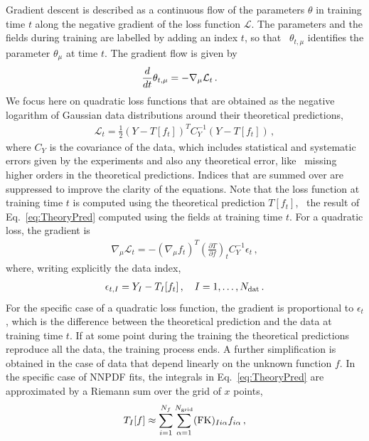 Gradient descent is described as a continuous flow of the parameters $\theta$ in training time $t$
along the negative gradient of the loss function $\mathcal{L}$. The parameters and the fields during
training are labelled by adding an index $t$, so that \eg\ $\theta_{t,\mu}$ identifies the parameter
$\theta_\mu$ at time $t$.
The gradient flow is given by
\begin{align}
    \label{eq:GradientFlowDef}
    \frac{d}{dt} &\theta_{t,\mu} = -\nabla_\mu \mathcal{L}_t\, .
\end{align}
We focus here on quadratic loss functions that are obtained as the negative logarithm of Gaussian
data distributions around their theoretical predictions,
\begin{align}
    \label{eq:QuadLoss}
    \mathcal{L}_t = \frac12 \left(Y - T[f_t]\right)^T C_Y^{-1} \left(Y - T[f_t]\right)\, ,
\end{align}
where $C_Y$ is the covariance of the data, which includes statistical and systematic errors given by
the experiments and also any theoretical error, like \eg\ missing higher orders in the theoretical
predictions. Indices that are summed over are suppressed to improve the clarity of the equations.
Note that the loss function at training time $t$ is computed using the theoretical prediction $T[f_t]$,
\ie\ the result of Eq.~\eqref{eq:TheoryPred} computed using the fields at training time $t$. For a quadratic
loss, the gradient is
\begin{align}
    \nabla_\mu \mathcal{L}_t = - \left(\nabla_\mu f_t\right)^T \left(\frac{\partial T}{\partial f}\right)_t
      C_Y^{-1} \epsilon_t\, ,
\end{align}
where, writing explicitly the data index,
\begin{align}
    \label{eq:EpsDef}
    \epsilon_{t,I} = Y_I - T_I[f_t]\, , \quad I=1, \ldots, N_{\mathrm{dat}}\, .
\end{align}
For the specific case of a quadratic loss function, the gradient is proportional to $\epsilon_t$, which
is the difference between the theoretical prediction and the data at training time $t$. If at some point
during the training the theoretical predictions reproduce all the data, the training process ends.
A further simplification is obtained in the case of data that depend linearly on the unknown function $f$.
In the specific case of NNPDF fits, the integrals in Eq.~\eqref{eq:TheoryPred} are approximated by
a Riemann sum over the grid of $x$ points,
\begin{align}
    \label{eq:FKTabDef}
    T_I[f] \approx \sum_{i=1}^{N_{f}}\sum_{\alpha=1}^{N_{\mathrm{grid}}} (\mathrm{FK})_{Ii\alpha} f_{i\alpha}\, ,
\end{align}
